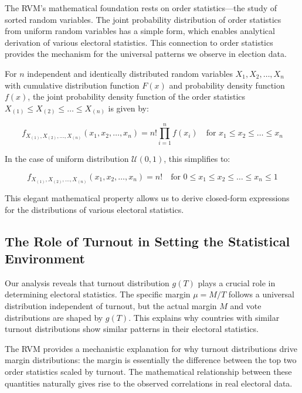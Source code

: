 The RVM's mathematical foundation rests on order statistics—the study of sorted random variables. The joint probability distribution of order statistics from uniform random variables has a simple form, which enables analytical derivation of various electoral statistics. This connection to order statistics provides the mechanism for the universal patterns we observe in election data.

For $n$ independent and identically distributed random variables $X_1, X_2, \ldots, X_n$ with cumulative distribution function $F(x)$ and probability density function $f(x)$, the joint probability density function of the order statistics $X_{(1)} \leq X_{(2)} \leq \ldots \leq X_{(n)}$ is given by:

\begin{equation}
    f_{X_{(1)}, X_{(2)}, \ldots, X_{(n)}}(x_1, x_2, \ldots, x_n) = n! \prod_{i=1}^{n} f(x_i) \quad \text{for } x_1 \leq x_2 \leq \ldots \leq x_n
\end{equation}

In the case of uniform distribution $\mathcal{U}(0,1)$, this simplifies to:

\begin{equation}
    f_{X_{(1)}, X_{(2)}, \ldots, X_{(n)}}(x_1, x_2, \ldots, x_n) = n! \quad \text{for } 0 \leq x_1 \leq x_2 \leq \ldots \leq x_n \leq 1
\end{equation}

This elegant mathematical property allows us to derive closed-form expressions for the distributions of various electoral statistics.

\subsection{The Role of Turnout in Setting the Statistical Environment}

Our analysis reveals that turnout distribution $g(T)$ plays a crucial role in determining electoral statistics. The specific margin $\mu = M/T$ follows a universal distribution independent of turnout, but the actual margin $M$ and vote distributions are shaped by $g(T)$. This explains why countries with similar turnout distributions show similar patterns in their electoral statistics.

The RVM provides a mechanistic explanation for why turnout distributions drive margin distributions: the margin is essentially the difference between the top two order statistics scaled by turnout. The mathematical relationship between these quantities naturally gives rise to the observed correlations in real electoral data.

